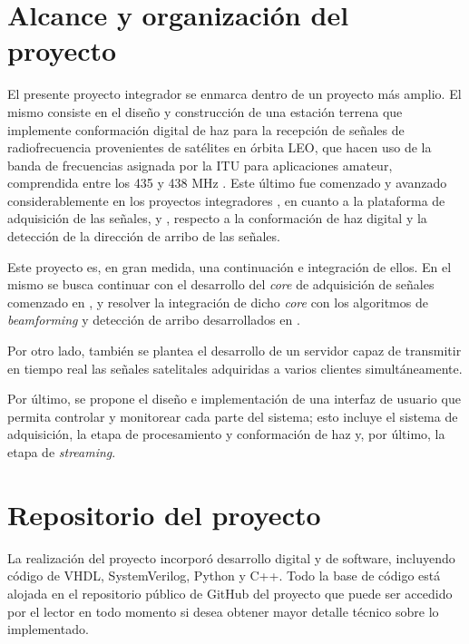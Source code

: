 \documentclass[../../main.tex]{subfiles}
\begin{document}

\section{Alcance y organización del proyecto}
El presente proyecto integrador se enmarca dentro de un proyecto más amplio. El mismo consiste en el diseño y construcción de una estación terrena que implemente conformación digital de haz 
para la recepción de señales de radiofrecuencia provenientes de satélites en órbita LEO, que hacen uso de la banda de frecuencias asignada por la ITU para aplicaciones amateur, comprendida entre los 435 y 438 MHz \cite{itu-banda-amateur}.
Este último fue comenzado y avanzado considerablemente en los proyectos integradores \cite{proyecto-jose}, en cuanto a la plataforma de adquisición de las señales, y \cite{proyecto-grigo}, respecto a la conformación de haz digital y la detección de la dirección de arribo de las señales. 

Este proyecto es, en gran medida, una continuación e integración de ellos. En el mismo se busca continuar con el desarrollo del \textit{core} de adquisición de señales comenzado en \cite{proyecto-jose}, y resolver la integración de dicho \textit{core} con los algoritmos de \textit{beamforming} y detección de arribo desarrollados en \cite{proyecto-grigo}.

Por otro lado, también se plantea el desarrollo de un servidor capaz de transmitir en tiempo real las señales satelitales adquiridas a varios clientes simultáneamente.

Por último, se propone el diseño e implementación de una interfaz de usuario que permita controlar y monitorear cada parte del sistema; esto incluye el sistema de adquisición, la etapa de procesamiento y conformación de haz y, por último, la etapa de \textit{streaming}.

\section{Repositorio del proyecto}
La realización del proyecto incorporó desarrollo digital y de software, incluyendo código de VHDL, SystemVerilog, Python y C++. Todo la base de código está alojada en el repositorio público de GitHub del proyecto \cite{github} que puede ser accedido por el lector en todo momento si desea obtener mayor detalle técnico sobre lo implementado.
\end{document}
